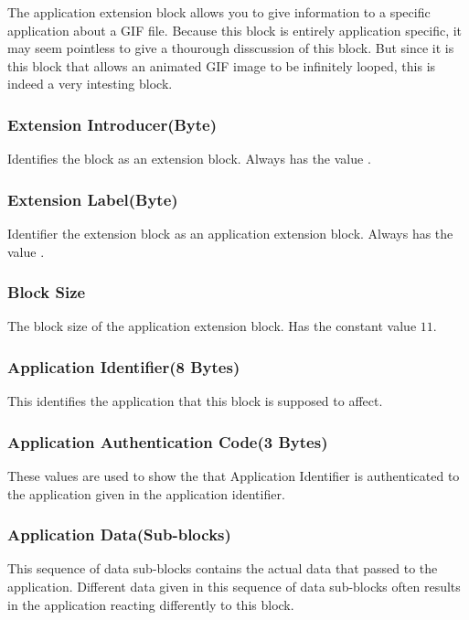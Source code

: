 \begin{refsection}
  The application extension block allows you to give information to a
  specific application about a GIF file. Because this block is
  entirely application specific, it may seem pointless to give a
  thourough disscussion of this block. But since it is this block that
  allows an animated GIF image to be infinitely looped, this is indeed
  a very intesting block.

  \subsubsection{Extension Introducer(Byte)}

  Identifies the block as an extension block. Always has the value
  .

  \subsubsection{Extension Label(Byte)}

  Identifier the extension block as an application extension
  block. Always has the value .

  \subsubsection{Block Size}

  The block size of the application extension block. Has the constant
  value $11$.

  \subsubsection{Application Identifier(8 Bytes)}

  This identifies the application that this block is supposed to
  affect.

  \subsubsection{Application Authentication Code(3 Bytes)}

  These values are used to show the that Application Identifier is
  authenticated to the application given in the application
  identifier.

  \subsubsection{Application Data(Sub-blocks)}

  This sequence of data sub-blocks contains the actual data that
  passed to the application. Different data given in this sequence of
  data sub-blocks often results in the application reacting
  differently to this block.


\end{refsection}
